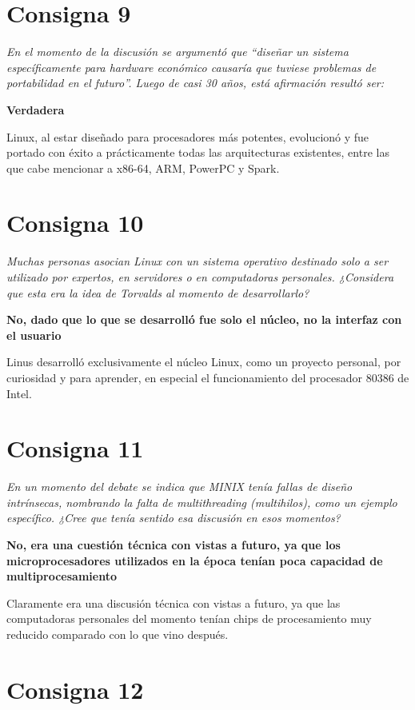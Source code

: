 \documentclass[11pt]{article}
\begin{document}
\section*{Consigna 9}

\emph{En el momento de la discusión se argumentó que “diseñar un sistema
específicamente para hardware económico causaría que tuviese problemas de
portabilidad en el futuro”.  Luego de casi 30 años, está afirmación resultó
ser:}

\textbf{Verdadera}

Linux, al estar diseñado para procesadores más potentes, evolucionó y fue
portado con éxito a prácticamente todas las arquitecturas existentes, entre las 
que cabe mencionar a x86-64, ARM, PowerPC y Spark.

\section*{Consigna 10}

\emph{Muchas personas asocian Linux con un sistema operativo destinado solo a
ser utilizado por expertos, en servidores o en computadoras personales.
¿Considera que esta era la idea de Torvalds al momento de desarrollarlo?}

\textbf{No, dado que lo que se desarrolló fue solo el núcleo, no la interfaz con
el usuario}

Linus desarrolló exclusivamente el núcleo Linux, como un proyecto personal, por 
curiosidad y para aprender, en especial el funcionamiento del procesador 80386
de Intel. 

\section*{Consigna 11}

\emph{En un momento del debate se indica que MINIX tenía fallas de diseño
intrínsecas, nombrando la falta de multithreading (multihilos), como un ejemplo
específico. ¿Cree que tenía sentido esa discusión en esos momentos?}

\textbf{No, era una cuestión técnica con vistas a futuro, ya que los
microprocesadores utilizados en la época tenían poca capacidad de
multiprocesamiento}

Claramente era una discusión técnica con vistas a futuro, ya que las
computadoras personales del momento tenían chips de procesamiento muy reducido 
comparado con lo que vino después. 

\section*{Consigna 12}
\end{document}
